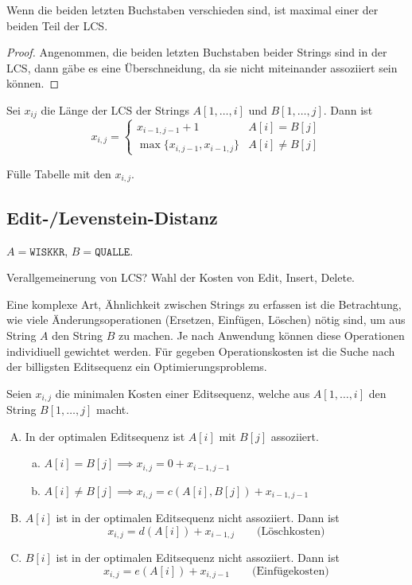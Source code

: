 \documentclass[11pt]{scrbook}
\begin{document}
\begin{st}
	Wenn die beiden letzten Buchstaben verschieden sind, ist maximal einer der beiden Teil der LCS.
	\begin{proof}
		Angenommen, die beiden letzten Buchstaben beider Strings sind in der LCS, dann gäbe es eine Überschneidung, da sie nicht miteinander assoziiert sein können.
	\end{proof}
\end{st}

\begin{st}
	Sei $x_{ij}$ die Länge der LCS der Strings $A[1,\dotsc,i]$ und $B[1,\dotsc,j]$.
	Dann ist
	\[
		x_{i,j} = \begin{cases}
			x_{i-1,j-1} + 1 			& A[i] = B[j] \\
			\max\{x_{i,j-1}, x_{i-1,j}\} & A[i] \neq B[j]
		\end{cases}
	\]
\end{st}

\begin{note}
	Fülle Tabelle mit den $x_{i,j}$.
\end{note}


\subsection{Edit-/Levenstein-Distanz}


\begin{ex}
	$A = \texttt{WISKKR}$, $B = \texttt{QUALLE}$.
\end{ex}
Verallgemeinerung von LCS? Wahl der Kosten von Edit, Insert, Delete.

Eine komplexe Art, Ähnlichkeit zwischen Strings zu erfassen ist die Betrachtung, wie viele Änderungsoperationen (Ersetzen, Einfügen, Löschen) nötig sind, um aus String $A$ den String $B$ zu machen.
Je nach Anwendung können diese Operationen individiuell gewichtet werden.
Für gegeben Operationskosten ist die Suche nach der billigsten Editsequenz ein Optimierungsproblems.

Seien $x_{i,j}$ die minimalen Kosten einer Editsequenz, welche aus $A[1,\dotsc,i]$ den String $B[1,\dotsc,j]$ macht.

\begin{enumerate}[A)]
	\item
		In der optimalen Editsequenz ist $A[i]$ mit $B[j]$ assoziiert.
		\begin{enumerate}[a)]
			\item
				$A[i] = B[j] \implies x_{i,j} = 0 + x_{i-1,j-1}$
			\item
				$A[i] \neq B[j] \implies x_{i,j} = c(A[i], B[j]) + x_{i-1,j-1}$
		\end{enumerate}
	\item
		$A[i]$ ist in der optimalen Editsequenz nicht assoziiert.
		Dann ist
		\[
			x_{i,j} = d(A[i]) + x_{i-1,j} \qquad \text{(Löschkosten)}
		\]
	\item
		$B[i]$ ist in der optimalen Editsequenz nicht assoziiert.
		Dann ist
		\[
			x_{i,j} = e(A[i]) + x_{i,j-1} \qquad \text{(Einfügekosten)}
		\]
\end{enumerate}
\end{document}
